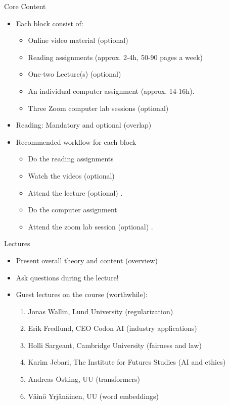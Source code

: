 \documentclass[10pt,handout]{beamer}
\begin{document}
\begin{frame}{Core Content}

\begin{itemize}
\item Each block consist of:
\begin{itemize}
\item Online video material (optional)
\item Reading assignments (approx. 2-4h, 50-90 pages a week)
\item One-two Lecture(s) (optional)
\item An individual computer assignment (approx. 14-16h).
\item Three Zoom computer lab sessions (optional)\pause
\end{itemize}
\item Reading: Mandatory and optional (overlap)\pause
\item Recommended workflow for each block
\begin{itemize}
\item Do the reading assignments
\item Watch the videos (optional)
\item Attend the lecture (optional) .
\item Do the computer assignment
\item Attend the zoom lab session (optional) .
\end{itemize}
\end{itemize}
\end{frame}


\begin{frame}{Lectures}

\begin{itemize}
\item Present overall theory and content (overview) \pause
\item Ask questions during the lecture!
\item Guest lectures on the course (worthwhile):
\begin{enumerate}
\item Jonas Wallin, Lund University (regularization)\pause
\item Erik Fredlund, CEO Codon AI (industry applications)\pause
\item Holli Sargeant, Cambridge University (fairness and law)\pause
\item Karim Jebari, The Institute for Futures Studies (AI and ethics)\pause
\item Andreas Östling, UU (transformers)\pause
\item Väinö Yrjänäinen, UU (word embeddings)
\end{enumerate}
\end{itemize}
\end{frame}
\end{document}

